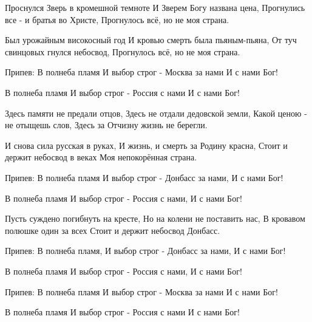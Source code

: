  
 
 
 
 

Проснулся Зверь в кромешной темноте
И Зверем Богу названа цена,
Прогнулись все - и братья во Христе,
Прогнулось всё, но не моя страна.
 
Был урожайным високосный год
И кровью смерть была пьяным-пьяна,
От туч свинцовых гнулся небосвод,
Прогнулось всё, но не моя страна.
 
Припев:
В полнеба пламя
И выбор строг -
Москва за нами
И с нами Бог!
 
В полнеба пламя
И выбор строг -
Россия с нами
И с нами Бог!
 
Здесь памяти не предали отцов,
Здесь не отдали дедовской земли,
Какой ценою - не отыщешь слов,
Здесь за Отчизну жизнь не берегли.
 
И снова сила русская в руках,
И жизнь, и смерть за Родину красна,
Стоит и держит небосвод в веках
Моя непокорённая страна.
 
Припев:
В полнеба пламя
И выбор строг -
Донбасс за нами,
И с нами Бог!
 
В полнеба пламя
И выбор строг -
Россия с нами,
И с нами Бог!
 
Пусть суждено погибнуть на кресте,
Но на колени не поставить нас,
В кровавом полюшке один за всех
Стоит и держит небосвод Донбасс.
 
Припев:
В полнеба пламя,
И выбор строг -
Донбасс за нами,
И с нами Бог!
 
В полнеба пламя
И выбор строг -
Россия с нами,
И с нами Бог!
 
Припев:
В полнеба пламя
И выбор строг -
Москва за нами
И с нами Бог!
 
В полнеба пламя
И выбор строг -
Россия с нами
И с нами Бог!  
